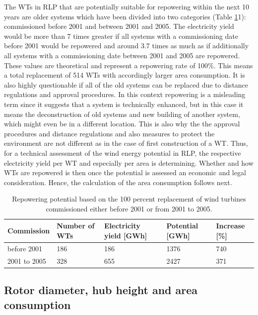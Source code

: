 \documentclass[a4paper,11pt]{article}
\begin{document}
The WTs in RLP that are potentially suitable for repowering within the next 10 years are older systems which have been divided into two categories (Table \ref{tab:table1}1): commissioned before 2001 and between 2001 and 2005. The electricity yield would be more than 7 times greater if all systems with a commissioning date before 2001 would be repowered and around 3.7 times as much as if additionally all systems with a commissioning date between 2001 and 2005 are repowered. These values are theoretical and represent a repowering rate of 100\%. This means a total replacement of 514 WTs with accordingly larger area consumption. It is also highly questionable if all of the old systems can be replaced due to distance regulations and approval procedures. In this context repowering is a misleading term since it suggests that a system is technically enhanced, but in this case it means the deconstruction of old systems and new building of another system, which might even be in a different location. This is also why the the approval procedures and distance regulations and also measures to protect the environment are not different as in the case of first construction of a WT. Thus, for a technical assessment of the wind energy potential in RLP, the respective electricity yield per WT and especially per area is determining. Whether and how WTs are repowered is then once the potential is assessed an economic and legal consideration. Hence, the calculation of the area consumption follows next.
\begin{table}[H]

\caption{\label{tab:table1}Repowering potential based on the 100 percent replacement of wind turbines commissioned either 
  before 2001 or from 2001 to 2005.}
\centering
\begin{tabular}[t]{lllll}
\toprule
Commission & Number of WTs & Electricity yield [GWh] & Potential [GWh] & Increase [\%]\\
\midrule
before 2001 & 186 & 186 & 1376 & 740\\
2001 to 2005 & 328 & 655 & 2427 & 371\\
\midrule
\bottomrule
\end{tabular}
\end{table}
\hypertarget{rotor-diameter-hub-height-and-area-consumption}{%
\subsection{Rotor diameter, hub height and area consumption}\label{rotor-diameter-hub-height-and-area-consumption}}
\end{document}

